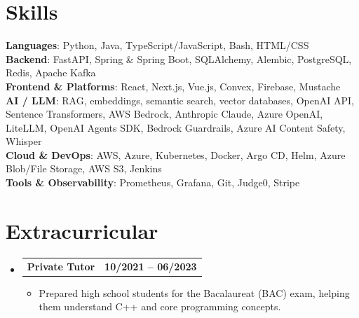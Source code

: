 \documentclass[letterpaper,11pt]{article}
\makeatletter
\newcommand{\resumeItem}[1]{
  \item\small{
    {#1 \vspace{-2pt}}
  }
}
\newcommand{\resumeProjectHeading}[2]{
    \item
    \begin{tabular*}{1.001\textwidth}{l@{\extracolsep{\fill}}r}
      \small#1 & \textbf{\small #2}\\
    \end{tabular*}\vspace{-7pt}
}
\newcommand{\resumeSubHeadingListStart}{\begin{itemize}[leftmargin=0.0in, label={}]}
\newcommand{\resumeSubHeadingListEnd}{\end{itemize}}
\newcommand{\resumeItemListStart}{\begin{itemize}}
\newcommand{\resumeItemListEnd}{\end{itemize}\vspace{-5pt}}
\makeatother
\begin{document}
\section{Skills}
 \begin{itemize}[leftmargin=0.15in, label={}]
    \small{\item{
     \textbf{Languages}{: Python, Java, TypeScript/JavaScript, Bash, HTML/CSS} \\
     \textbf{Backend}{: FastAPI, Spring \& Spring Boot, SQLAlchemy, Alembic, PostgreSQL, Redis, Apache Kafka} \\
     \textbf{Frontend \& Platforms}{: React, Next.js, Vue.js, Convex, Firebase, Mustache} \\
     \textbf{AI / LLM}{: RAG, embeddings, semantic search, vector databases, OpenAI API, Sentence Transformers, AWS Bedrock, Anthropic Claude, Azure OpenAI, LiteLLM, OpenAI Agents SDK, Bedrock Guardrails, Azure AI Content Safety, Whisper} \\
     \textbf{Cloud \& DevOps}{: AWS, Azure, Kubernetes, Docker, Argo CD, Helm, Azure Blob/File Storage, AWS S3, Jenkins} \\
     \textbf{Tools \& Observability}{: Prometheus, Grafana, Git, Judge0, Stripe} \\
    }}
 \end{itemize}
 \vspace{-16pt}


\section{Extracurricular}
    \resumeSubHeadingListStart

        \resumeProjectHeading{\textbf{Private Tutor}}{10/2021 -- 06/2023}
            \resumeItemListStart
                \resumeItem{Prepared high school students for the Bacalaureat (BAC) exam, helping them understand C++ and core programming concepts.}
            \resumeItemListEnd

    \resumeSubHeadingListEnd
\end{document}
